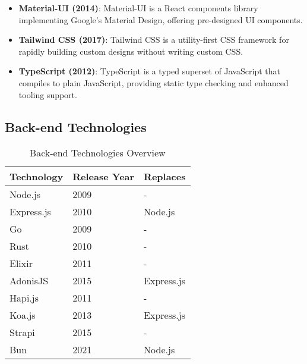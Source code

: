 \documentclass[conference]{IEEEtran}
\begin{document}
\begin{itemize}
    \item \textbf{Material-UI (2014)}:
    Material-UI is a React components library implementing Google's Material Design, offering pre-designed UI components.
    
    \item \textbf{Tailwind CSS (2017)}:
    Tailwind CSS is a utility-first CSS framework for rapidly building custom designs without writing custom CSS.
    
    \item \textbf{TypeScript (2012)}:
    TypeScript is a typed superset of JavaScript that compiles to plain JavaScript, providing static type checking and enhanced tooling support.
\end{itemize}

\subsection{Back-end Technologies}

\begin{table}[ht]
    \centering
    \caption{Back-end Technologies Overview}
    \begin{tabular}{|l|l|l|}
    \hline
    \textbf{Technology} & \textbf{Release Year} & \textbf{Replaces} \\
    \hline
    Node.js    & 2009 & - \\
    Express.js & 2010 & Node.js \\
    Go         & 2009 & - \\
    Rust       & 2010 & - \\
    Elixir     & 2011 & - \\
    AdonisJS   & 2015 & Express.js \\
    Hapi.js    & 2011 & - \\
    Koa.js     & 2013 & Express.js \\
    Strapi     & 2015 & - \\
    Bun        & 2021 & Node.js \\
    \hline
    \end{tabular}
    \end{table}
\end{document}

